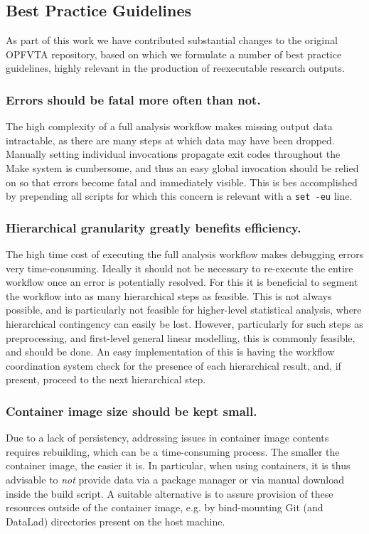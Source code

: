 \subsection{Best Practice Guidelines}

As part of this work we have contributed substantial changes to the original OPFVTA repository, based on which we formulate a number of best practice guidelines, highly relevant in the production of reexecutable research outputs.

\subsubsection{Errors should be fatal more often than not.}
The high complexity of a full analysis workflow makes missing output data intractable, as there are many steps at which data may have been dropped.
Manually setting individual invocations propagate exit codes throughout the Make system is cumbersome, and thus an easy global invocation should be relied on so that errors become fatal and immediately visible.
This is bes accomplished by prepending all scripts for which this concern is relevant with a \texttt{set -eu} line.

\subsubsection{Hierarchical granularity greatly benefits efficiency.}
The high time cost of executing the full analysis workflow makes debugging errors very time-consuming.
Ideally it should not be necessary to re-execute the entire workflow once an error is potentially resolved.
For this it is beneficial to segment the workflow into as many hierarchical steps as feasible.
This is not always possible, and is particularly not feasible for higher-level statistical analysis, where hierarchical contingency can easily be lost.
However, particularly for such steps as preprocessing, and first-level general linear modelling, this is commonly feasible, and should be done.
An easy implementation of this is having the workflow coordination system check for the presence of each hierarchical result, and, if present, proceed to the next hierarchical step.

\subsubsection{Container image size should be kept small.}
Due to a lack of persistency, addressing issues in container image contents requires rebuilding, which can be a time-consuming process.
The smaller the container image, the easier it is.
In particular, when using containers, it is thus advisable to \textit{not} provide data via a package manager or via manual download inside the build script.
A suitable alternative is to assure provision of these resources outside of the container image, e.g. by bind-mounting Git (and DataLad) directories present on the host machine.

